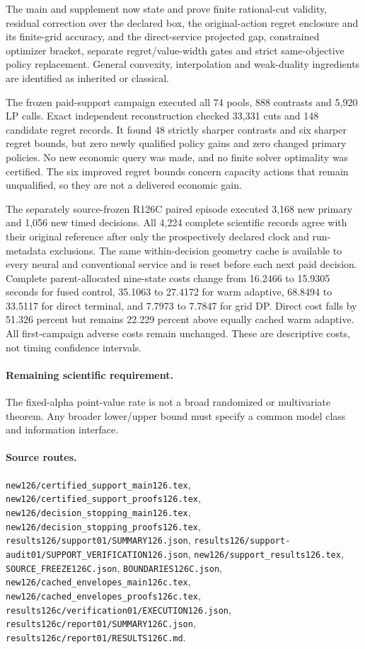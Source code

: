 The main and supplement now state and prove finite rational-cut validity, residual correction over the declared box, the original-action regret enclosure and its finite-grid accuracy, and the direct-service projected gap, constrained optimizer bracket, separate regret/value-width gates and strict same-objective policy replacement. General convexity, interpolation and weak-duality ingredients are identified as inherited or classical.\par
The frozen paid-support campaign executed all 74 pools, 888 contrasts and 5,920 LP calls. Exact independent reconstruction checked 33,331 cuts and 148 candidate regret records. It found 48 strictly sharper contrasts and six sharper regret bounds, but zero newly qualified policy gains and zero changed primary policies. No new economic query was made, and no finite solver optimality was certified. The six improved regret bounds concern capacity actions that remain unqualified, so they are not a delivered economic gain.\par
The separately source-frozen R126C paired episode executed 3,168 new primary and 1,056 new timed decisions. All 4,224 complete scientific records agree with their original reference after only the prospectively declared clock and run-metadata exclusions. The same within-decision geometry cache is available to every neural and conventional service and is reset before each next paid decision. Complete parent-allocated nine-state costs change from 16.2466 to 15.9305 seconds for fused control, 35.1063 to 27.4172 for warm adaptive, 68.8494 to 33.5117 for direct terminal, and 7.7973 to 7.7847 for grid DP. Direct cost falls by 51.326 percent but remains 22.229 percent above equally cached warm adaptive. All first-campaign adverse costs remain unchanged. These are descriptive costs, not timing confidence intervals.\par

\paragraph{Remaining scientific requirement.} The fixed-alpha point-value rate is not a broad randomized or multivariate theorem. Any broader lower/upper bound must specify a common model class and information interface.

\paragraph{Source routes.} \nolinkurl{new126/certified_support_main126.tex}, \nolinkurl{new126/certified_support_proofs126.tex}, \nolinkurl{new126/decision_stopping_main126.tex}, \nolinkurl{new126/decision_stopping_proofs126.tex}, \nolinkurl{results126/support01/SUMMARY126.json}, \nolinkurl{results126/support-audit01/SUPPORT_VERIFICATION126.json}, \nolinkurl{new126/support_results126.tex}, \nolinkurl{SOURCE_FREEZE126C.json}, \nolinkurl{BOUNDARIES126C.json}, \nolinkurl{new126/cached_envelopes_main126c.tex}, \nolinkurl{new126/cached_envelopes_proofs126c.tex}, \nolinkurl{results126c/verification01/EXECUTION126.json}, \nolinkurl{results126c/report01/SUMMARY126C.json}, \nolinkurl{results126c/report01/RESULTS126C.md}.

